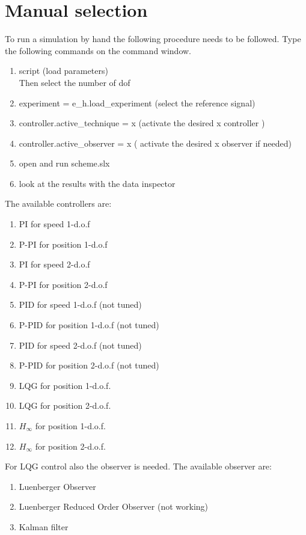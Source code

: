 \documentclass{report}
\begin{document}
\section{Manual selection}
To run a simulation by hand the following procedure needs to be followed. 
Type the following commands on the command window.

\begin{enumerate}
	\item script (load parameters)\\
	Then select the number of dof
	\item experiment = e\_h.load\_experiment (select the reference signal)
	\item controller.active\_technique = x (activate the desired x controller )
	\item controller.active\_observer = x ( activate the desired x observer if needed)
	\item open and run scheme.slx 
	\item look at the results with the data inspector
\end{enumerate}

The available controllers are:
\begin{enumerate}
	\item PI for speed 1-d.o.f
	\item P-PI for position 1-d.o.f
	\item PI for speed 2-d.o.f
	\item P-PI for position 2-d.o.f
	
	\item PID for speed 1-d.o.f (not tuned)
	\item P-PID for position 1-d.o.f (not tuned)
	\item PID for speed 2-d.o.f (not tuned)
	\item P-PID for position 2-d.o.f (not tuned)
	
	\item LQG for position 1-d.o.f. 
	\item LQG for position 2-d.o.f.
	
	\item $H_\infty$ for position 1-d.o.f.
	\item $H_\infty$ for position 2-d.o.f.	
\end{enumerate}

For LQG control also the observer is needed. 
The available observer are:
\begin{enumerate}
	\item Luenberger Observer
	\item Luenberger Reduced Order Observer (not working)
	\item Kalman filter
\end{enumerate}
\end{document}
